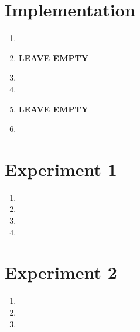 \documentclass{article}
\begin{document}
\section{Implementation}

\begin{enumerate}[label=\alph*.]
    \item
    \item \textbf{LEAVE EMPTY}
    \item
    \item
    \item \textbf{LEAVE EMPTY}
    \item
\end{enumerate}

\section{Experiment 1}

\begin{enumerate}[label=\alph*.]
    \item
    \item
    \item
    \item
\end{enumerate}

\section{Experiment 2}

\begin{enumerate}[label=\alph*.]
    \item
    \item
    \item
\end{enumerate}


\end{document}
